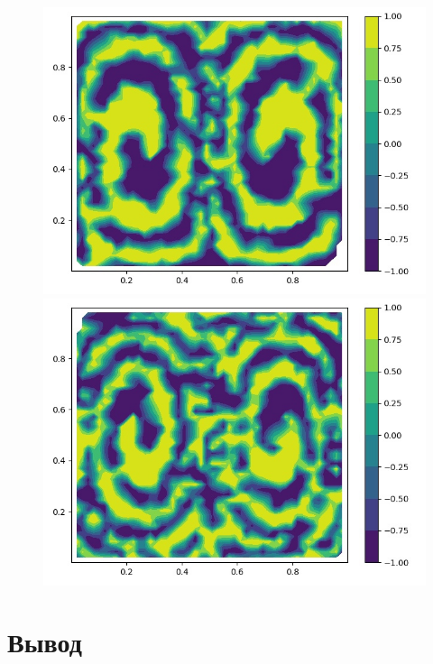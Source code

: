 \documentclass[a4paper, 14pt]{extarticle}
\begin{document}
		\begin{figure}[H]
			\begin{minipage}{0.5\textwidth}
				\centering
				\includegraphics[width = \linewidth]{11.jpg}
			\end{minipage}\hfill
			\begin{minipage}{0.5\textwidth}
				\centering
				\includegraphics[width = \linewidth]{12.jpg}
			\end{minipage}\hfill
		\end{figure}
		
	\section{Вывод}
		
\end{document}
